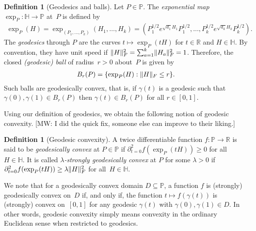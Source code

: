 \documentclass[aos]{imsart}
\theoremstyle{definition}
\newtheorem{definition}[theorem]{Definition}
\numberwithin{equation}{section}
\DeclarePairedDelimiter{\norm}{\lVert}{\rVert}
\newcommand{\R}{{\mathbb{R}}}
\renewcommand{\P}{{\mathbb{P}}}
\renewcommand{\H}{{\mathbb{H}}}
\newcommand{\MW}[1]{{\color{red}[MW: #1]}}
\begin{document}
\begin{definition}[Geodesics and balls]
Let $P\in\P$.
The \emph{exponential map} $\exp_P \colon \H \to \P$ at~$P$ is defined by
\begin{align*}
  \exp_P(H) = \exp_{(P_1,\dots,P_k)}(H_1,\dots,H_k) = \left( P_1^{1/2} e^{\sqrt{d_1} H_1} P_1^{1/2}, \dots, P_k^{1/2} e^{\sqrt{d_k} H_k} P_k^{1/2} \right).
\end{align*}
The \emph{geodesics} through $P$ are the curves $t \mapsto \exp_P(t H)$ for $t\in\R$ and $H\in\H$.
By convention, they have unit speed if $\norm{H}_F^2 = \sum_{a=1}^k \norm{H_a}_F^2 = 1$.
Therefore, the closed \emph{(geodesic) ball} of radius~$r>0$ about~$P$ is given by
\begin{align*}
  B_r(P) = \{ \exp_P(H) : \norm H_F \leq r \}.
\end{align*}
Such balls are geodesically convex, that is, if $\gamma(t)$ is a geodesic such that $\gamma(0),\gamma(1) \in B_r(P)$ then $\gamma(t) \in B_r(P)$ for all $r\in[0,1]$.

\end{definition}

Using our definition of geodesics, we obtain the following notion of geodesic convexity.
\MW{I did the quick fix, someone else can improve to their liking.}

\begin{definition}[Geodesic convexity]
A twice differentiable function $f\colon \P \to \R$ is said to be \emph{geodesically convex} at $P\in\P$ if $\partial^2_{t=0} f(\exp_P(tH)) \geq 0$ for all~$H\in\H$.
It is called \emph{$\lambda$-strongly geodesically convex} at $P$ for some $\lambda>0$ if $\partial^2_{t=0} f(\exp_P(tH)) \geq \lambda \norm H_F^2$ for all~$H\in\H$.

We note that for a geodesically convex domain $D \subseteq \P$, a function $f$ is (strongly) geodesically convex on~$D$ if, and only if, the function $t \mapsto f(\gamma(t))$ is (strongly) convex on~$[0,1]$ for any geodesic $\gamma(t)$ with $\gamma(0),\gamma(1)\in D$.
In other words, geodesic convexity simply means convexity in the ordinary Euclidean sense when restricted to geodesics.

\end{definition}
\end{document}
